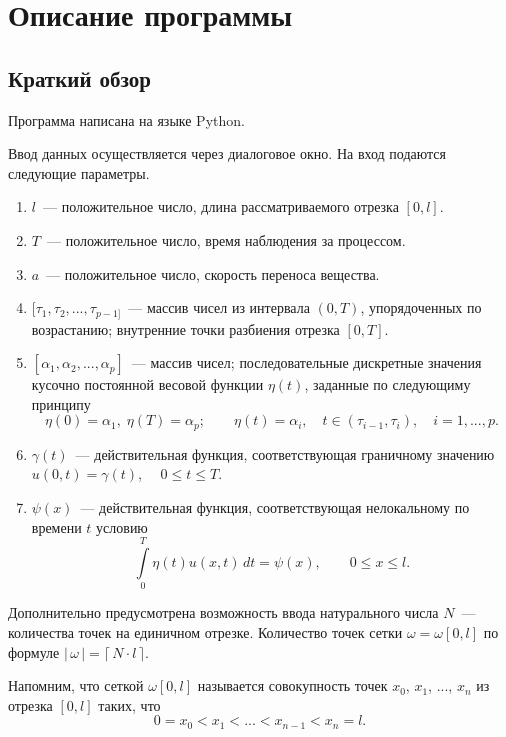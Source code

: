 \documentclass{article}
\renewcommand{\le}{\leqslant}
\theoremstyle{definition}
\begin{document}
\newpage

\section{Описание программы}

\subsection{Краткий обзор}
Программа написана на языке Python.

Ввод данных осуществляется через диалоговое окно. На вход подаются следующие параметры.
\begin{enumerate}
	\item $l$~--- положительное число, длина рассматриваемого отрезка $[0,l]$.
	\item $T$~--- положительное число, время наблюдения за процессом.
	\item $a$~--- положительное число, скорость переноса вещества.
	\item $[\tau_1, \tau_2, ..., \tau_{p - 1]}$~--- массив чисел из интервала $(0,T)$, упорядоченных по возрастанию; 
	внутренние точки разбиения отрезка $[0,T]$.
	\item $[\alpha_1, \alpha_2, ..., \alpha_p]$~--- массив чисел; последовательные дискретные
	значения кусочно постоянной весовой функции $\eta(t)$, заданные по следующиму принципу
	\begin{equation*}
		\eta(0) = \alpha_1, \; \eta(T) = \alpha_p; \qquad \eta(t) = \alpha_i, \quad t \in (\tau_{i - 1}, \tau_i), \quad i = 1, ..., p.
	\end{equation*}  
	\item $\gamma(t)$~--- действительная функция, соответствующая граничному значению $u(0,t) = \gamma(t)$, $ \quad 0 \le t \le T$.
	\item $\psi(x)$~--- действительная функция, соответствующая нелокальному по времени $t$ условию
	\begin{equation*}
		\int\limits_{0}^{T} \eta(t) u(x, t)\,dt = \psi(x), 	\qquad 0 \le x \le l.
	\end{equation*}
\end{enumerate}
Дополнительно предусмотрена возможность ввода натурального числа $N$~--- количества точек на единичном отрезке. 
Количество точек сетки $\omega = \omega[0,l]$ по формуле $|\, \omega \,| = \lceil\, N \!\cdot\! l \,\rceil$.

Напомним, что сеткой $\omega[0,l]$ называется совокупность точек $x_0$, $x_1$, ..., $x_n$ из отрезка $[0,l]$ таких, что
\begin{equation*}
	0 = x_0 < x_1 < ... < x_{n - 1} < x_n = l.
\end{equation*}
\end{document}
